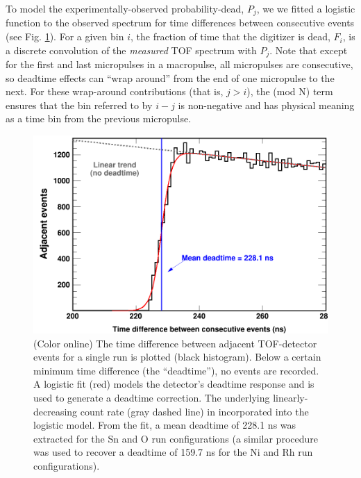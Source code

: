 \documentclass[twocolumn,secnumarabic,amssymb, nobibnotes, aps, prl,
superscriptaddress, nobalancelastpage]{revtex4}
\begin{document}
To model the experimentally-observed probability-dead, $P_{j}$, we
we fitted a logistic function to the observed spectrum for time
differences between consecutive events (see Fig.
\ref{TimeDifferenceBetweenEvents}). For a given bin $i$, the fraction of time that the 
digitizer is dead, $F_{i}$, is a discrete convolution of the
\textit{measured} TOF spectrum with $P_{j}$. Note that except for the first and
last micropulses in a macropulse, all micropulses are consecutive, so deadtime effects can
``wrap around'' from the end of one micropulse to the next. For these wrap-around
contributions (that is, $j>i$), the (mod N) term ensures that the bin referred
to by $i-j$ is non-negative and has physical meaning as a time bin from the 
previous micropulse.
\begin{figure}
    \includegraphics[width=\linewidth]{figures/TimeDifferenceBetweenEvents.png}
    \caption{(Color online) The time difference between adjacent TOF-detector
    events for a single run is plotted (black histogram). Below a certain
minimum time difference (the ``deadtime''), no events are recorded. A logistic
fit (red) models the detector's deadtime response and is used to generate a
deadtime correction. The underlying linearly-decreasing count rate (gray dashed
line) in incorporated into the logistic model. From the fit, a mean deadtime of
228.1 ns was extracted for the Sn and O run configurations (a similar
procedure was used to recover a deadtime of 159.7 ns for the Ni and Rh
run configurations).}
    \label{TimeDifferenceBetweenEvents}
\end{figure}
\end{document}
